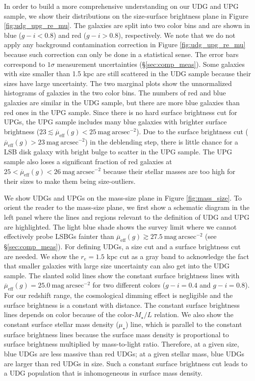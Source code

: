 \documentclass[twocolumn,astrosymb,twocolappendix]{aastex631}
\newcommand{\sbunit}{\mathrm{mag\ arcsec}^{-2}}
\newcommand{\sbeff}{\overline{\mu}_{\mathrm{eff}}(g)}
\begin{document}
\begin{CJK*}{UTF8}{gbsn}
In order to build a more comprehensive understanding on our UDG and UPG sample, we show their distributions on the size-surface brightness plane in Figure \ref{fig:udg_upg_re_mu}. The galaxies are split into two color bins and are shown in blue ($g-i < 0.8$) and red ($g-i > 0.8$), respectively. We note that we do not apply any background contamination correction in Figure \ref{fig:udg_upg_re_mu} because such correction can only be done in a statistical sense. The error bars correspond to $1\sigma$ measurement uncertainties (\S\ref{sec:comp_meas}). Some galaxies with size smaller than 1.5 kpc are still scattered in the UDG sample because their sizes have large uncertainty. The two marginal plots show the unnormalized histograms of galaxies in the two color bins. The numbers of red and blue galaxies are similar in the UDG sample, but there are more blue galaxies than red ones in the UPG sample. Since there is no hard surface brightness cut for UPGs, the UPG sample includes many blue galaxies with brighter surface brightness ($23 \lesssim \sbeff < 25\ \sbunit$). Due to the surface brightness cut ($\sbeff > 23\ \sbunit$) in the deblending step, there is little chance for a LSB disk galaxy with bright bulge to scatter in the UPG sample. The UPG sample also loses a significant fraction of red galaxies at $25 < \sbeff < 26\ \sbunit$ because their stellar masses are too high for their sizes to make them being size-outliers. 


We show UDGs and UPGs on the mass-size plane in Figure \ref{fig:mass_size}. To orient the reader to the mass-size plane, we first show a schematic diagram in the left panel where the lines and regions relevant to the definition of UDG and UPG are highlighted. The light blue shade shows the survey limit where we cannot effectively probe LSBGs fainter than $\sbeff \gtrsim 27.5\ \sbunit$ (see \S\ref{sec:comp_meas}). 
For defining UDGs, a size cut and a surface brightness cut are needed. We show the $r_e = 1.5$ kpc cut as a gray band to acknowledge the fact that smaller galaxies with large size uncertainty can also get into the UDG sample. The slanted solid lines show the constant surface brightness lines with $\sbeff = 25.0\ \sbunit$ for two different colors ($g-i=0.4$ and $g-i=0.8$). For our redshift range, the cosmological dimming effect is negligible and the surface brightness is a constant with distance. The constant surface brightness lines depends on color because of the color-$M_\star/L$ relation. We also show the constant surface stellar mass density ($\mu_\star$) line, which is parallel to the constant surface brightness lines because the surface mass density is proportional to surface brightness multiplied by mass-to-light ratio. Therefore, at a given size, blue UDGs are less massive than red UDGs; at a given stellar mass, blue UDGs are larger than red UDGs in size. Such a constant surface brightness cut leads to a UDG population that is inhomogeneous in surface mass density. 


\end{CJK*}
\end{document}
